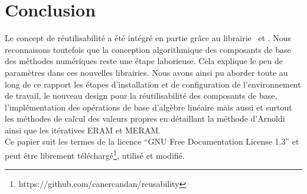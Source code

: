%

\section{Conclusion}

Le concept de réutilisabilité a été intégré en partie grâce au librairie \petscx\ et \slepcx. Nous reconnaisons toutefois que la conception algorithmique des composants de base des méthodes numériques reste une étape laborieuse. Cela explique le peu de paramètres dans ces nouvelles librairies. Nous avons ainsi pu aborder toute au long de ce rapport les étapes d'installation et de configuration de l'environnement de travail, le nouveau design pour la réutilisabilité des composants de base, l'implémentation des opérations de base d'algèbre linéaire mais aussi et surtout les méthodes de calcul des valeurs propres en détaillant la méthode d'Arnoldi ainsi que les itératives ERAM et MERAM.\\

Ce papier suit les termes de la licence ``GNU Free Documentation License 1.3'' et peut être librement téléchargé\footnote{https://github.com/canercandan/reusability}, utilisé et modifié.
